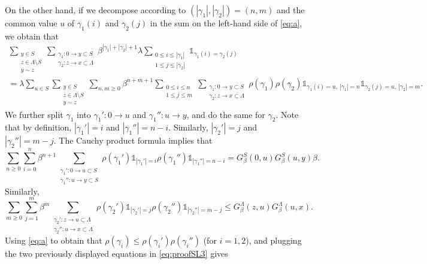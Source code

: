 \documentclass[11pt,a4paper]{article}
\numberwithin{equation}{section}
\theoremstyle{plain}
\theoremstyle{definition}
\begin{document}
On the other hand, if we decompose according to $(|\gamma_1|,|\gamma_2|)=(n,m)$ and the common value $u$ of $\gamma_1(i)$ and $\gamma_2(j)$ in the sum on the left-hand side of \eqref{eq:a}, we obtain that
\begin{multline}\label{eq:proofSL3}
	\sum_{\substack{y\in S\\ z\in \Lambda\setminus S\\ y\sim z}}\sum_{\substack{\gamma_1:0\rightarrow y\subset S\\\gamma_2:z\rightarrow x\subset \Lambda}}\beta^{|\gamma_1|+|\gamma_2|+1}\lambda \sum_{\substack{0\leq i \leq |\gamma_1|\\1\leq j \leq |\gamma_2|}}\mathds{1}_{\gamma_1(i)=\gamma_2(j)}
	\\=\lambda \sum_{u\in S}\sum_{\substack{y\in S\\ z\in \Lambda \setminus S\\ y\sim z}}\sum_{n,m\geq 0}\beta^{n+m+1}\sum_{\substack{0\leq i \leq n\\1\leq j \leq m}}\sum_{\substack{\gamma_1:0\rightarrow y \subset S\\ \gamma_2: z \rightarrow x \subset \Lambda}}\rho(\gamma_1)\rho(\gamma_2)\mathds{1}_{\gamma_1(i)=u, \: |\gamma_1|=n}\mathds{1}_{\gamma_2(j)=u, \: |\gamma_2|=m}.
\end{multline}
We further split $\gamma_1$ into $\gamma_1':0 \rightarrow u$ and $\gamma_1'':u\rightarrow y$, and do the same for $\gamma_2$. Note that by definition, $|\gamma_1'|=i$ and $|\gamma_1''|=n-i$. Similarly, $|\gamma_2'|=j$ and $|\gamma_2''|=m-j$. The Cauchy product formula implies that
\begin{equation}
	\sum_{n\geq 0}\sum_{i=0}^n \beta^{n+1}\sum_{\substack{\gamma_1':0\rightarrow u\subset S\\ \gamma_1'':u \rightarrow y\subset S}}\rho(\gamma_1')\mathds{1}_{|\gamma_1'|=i}\rho(\gamma_1'')\mathds{1}_{|\gamma_1''|=n-i}=G^S_\beta(0,u)G^S_\beta(u,y)\beta.
\end{equation}
Similarly,
\begin{equation}
	\sum_{m\geq 0}\sum_{j=1}^m \beta^{m}\sum_{\substack{\gamma_2':z\rightarrow u\subset \Lambda\\ \gamma_2'':u \rightarrow x\subset \Lambda}}\rho(\gamma_2')\mathds{1}_{|\gamma_2'|=j}\rho(\gamma_2'')\mathds{1}_{|\gamma_2''|=m-j}\leq G^\Lambda_\beta(z,u)G^\Lambda_\beta(u,x).
\end{equation}
Using \eqref{eq:a} to obtain that $\rho(\gamma_i)\leq \rho(\gamma_i')\rho(\gamma_i'')$ (for $i=1,2$), and plugging the two previously displayed equations in \eqref{eq:proofSL3} gives
\end{document}
